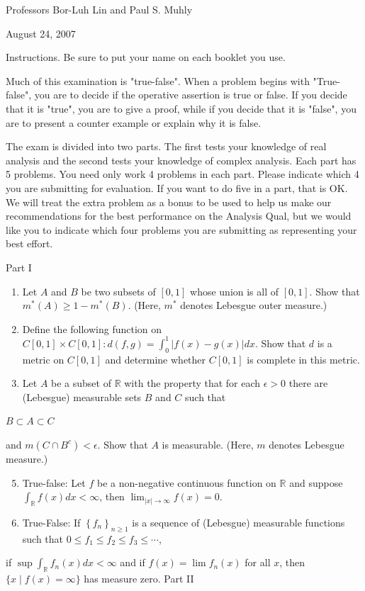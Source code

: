 \documentclass[10pt]{article}
\begin{document}
Professors Bor-Luh Lin and Paul S. Muhly

August 24, 2007

Instructions. Be sure to put your name on each booklet you use.

Much of this examination is "true-false". When a problem begins with "True-false", you are to decide if the operative assertion is true or false. If you decide that it is "true", you are to give a proof, while if you decide that it is "false", you are to present a counter example or explain why it is false.

The exam is divided into two parts. The first tests your knowledge of real analysis and the second tests your knowledge of complex analysis. Each part has 5 problems. You need only work 4 problems in each part. Please indicate which 4 you are submitting for evaluation. If you want to do five in a part, that is OK. We will treat the extra problem as a bonus to be used to help us make our recommendations for the best performance on the Analysis Qual, but we would like you to indicate which four problems you are submitting as representing your best effort.

Part I

\begin{enumerate}
  \item Let $A$ and $B$ be two subsets of $[0,1]$ whose union is all of $[0,1]$. Show that $m^{*}(A) \geq 1-m^{*}(B)$. (Here, $m^{*}$ denotes Lebesgue outer measure.)

  \item Define the following function on $C[0,1] \times C[0,1]: d(f, g)=\int_{0}^{1}|f(x)-g(x)| d x$. Show that $d$ is a metric on $C[0,1]$ and determine whether $C[0,1]$ is complete in this metric.

  \item Let $A$ be a subset of $\mathbb{R}$ with the property that for each $\epsilon>0$ there are (Lebesgue) measurable sets $B$ and $C$ such that

\end{enumerate}
$B \subset A \subset C$

and $m\left(C \cap B^{c}\right)<\epsilon$. Show that $A$ is measurable. (Here, $m$ denotes Lebesgue measure.)

\begin{enumerate}
  \setcounter{enumi}{4}
  \item True-false: Let $f$ be a non-negative continuous function on $\mathbb{R}$ and suppose $\int_{\mathbb{R}} f(x) d x<\infty$, then $\lim _{|x| \rightarrow \infty} f(x)=0 .$

  \item True-False: If $\left\{f_{n}\right\}_{n \geq 1}$ is a sequence of (Lebesgue) measurable functions such that $0 \leq f_{1} \leq f_{2} \leq f_{3} \leq \cdots$,

\end{enumerate}
if $\sup \int_{\mathbb{R}} f_{n}(x) d x<\infty$ and if $f(x)=\lim f_{n}(x)$ for all $x$, then $\{x \mid f(x)=\infty\}$ has measure zero. Part II
\end{document}
